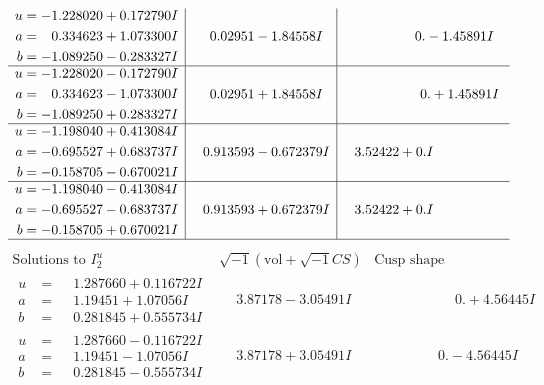 \documentclass[1p]{elsarticle_modified}
\theoremstyle{definition}
\newcommand{\I}{\sqrt{-1}}
\begin{document}
$$\begin{array}{c|c|c}
\begin{aligned}
u &= -1.228020 + 0.172790 I \\
a &= \phantom{-}0.334623 + 1.073300 I \\
b &= -1.089250 - 0.283327 I\end{aligned}
 & \phantom{-}0.02951 - 1.84558 I & \phantom{-0.000000 } 0. - 1.45891 I \\ \hline\begin{aligned}
u &= -1.228020 - 0.172790 I \\
a &= \phantom{-}0.334623 - 1.073300 I \\
b &= -1.089250 + 0.283327 I\end{aligned}
 & \phantom{-}0.02951 + 1.84558 I & \phantom{-0.000000 -}0. + 1.45891 I \\ \hline\begin{aligned}
u &= -1.198040 + 0.413084 I \\
a &= -0.695527 + 0.683737 I \\
b &= -0.158705 - 0.670021 I\end{aligned}
 & \phantom{-}0.913593 - 0.672379 I & \phantom{-}3.52422 + 0. I\phantom{ +0.000000I} \\ \hline\begin{aligned}
u &= -1.198040 - 0.413084 I \\
a &= -0.695527 - 0.683737 I \\
b &= -0.158705 + 0.670021 I\end{aligned}
 & \phantom{-}0.913593 + 0.672379 I & \phantom{-}3.52422 + 0. I\phantom{ +0.000000I}\\
 \hline 
 \end{array}$$\newpage$$\begin{array}{c|c|c}  
\text{Solutions to }I^u_{2}& \I (\text{vol} + \sqrt{-1}CS) & \text{Cusp shape}\\
 \hline 
\begin{aligned}
u &= \phantom{-}1.287660 + 0.116722 I \\
a &= \phantom{-}1.19451 + 1.07056 I \\
b &= \phantom{-}0.281845 + 0.555734 I\end{aligned}
 & \phantom{-}3.87178 - 3.05491 I & \phantom{-0.000000 -}0. + 4.56445 I \\ \hline\begin{aligned}
u &= \phantom{-}1.287660 - 0.116722 I \\
a &= \phantom{-}1.19451 - 1.07056 I \\
b &= \phantom{-}0.281845 - 0.555734 I\end{aligned}
 & \phantom{-}3.87178 + 3.05491 I & \phantom{-0.000000 } 0. - 4.56445 I \\ \hline\begin{aligned}

\end{aligned}
\end{array}$$
\end{document}
